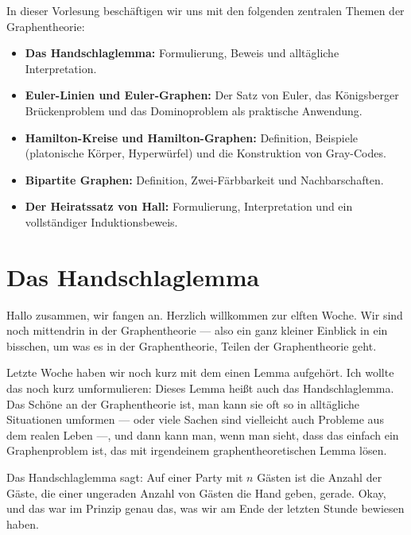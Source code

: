 

\begin{nice-box}
In dieser Vorlesung beschäftigen wir uns mit den folgenden zentralen Themen der Graphentheorie:
\begin{itemize}
    \item \textbf{Das Handschlaglemma:} Formulierung, Beweis und alltägliche Interpretation.
    \item \textbf{Euler-Linien und Euler-Graphen:} Der Satz von Euler, das Königsberger Brückenproblem und das Dominoproblem als praktische Anwendung.
    \item \textbf{Hamilton-Kreise und Hamilton-Graphen:} Definition, Beispiele (platonische Körper, Hyperwürfel) und die Konstruktion von Gray-Codes.
    \item \textbf{Bipartite Graphen:} Definition, Zwei-Färbbarkeit und Nachbarschaften.
    \item \textbf{Der Heiratssatz von Hall:} Formulierung, Interpretation und ein vollständiger Induktionsbeweis.
\end{itemize}
\end{nice-box}

\section{Das Handschlaglemma}

\begin{spoken-clean}[00:00:00 - 00:01:58]
Hallo zusammen, wir fangen an. Herzlich willkommen zur elften Woche. Wir sind noch mittendrin in der Graphentheorie --- also ein ganz kleiner Einblick in ein bisschen, um was es in der Graphentheorie, Teilen der Graphentheorie geht.

Letzte Woche haben wir noch kurz mit dem einen Lemma aufgehört. Ich wollte das noch kurz umformulieren: Dieses Lemma heißt auch das Handschlaglemma.  Das Schöne an der Graphentheorie ist, man kann sie oft so in alltägliche Situationen umformen --- oder viele Sachen sind vielleicht auch Probleme aus dem realen Leben ---, und dann kann man, wenn man sieht, dass das einfach ein Graphenproblem ist, das mit irgendeinem graphentheoretischen Lemma lösen.

Das Handschlaglemma sagt: Auf einer Party mit $n$ Gästen ist die Anzahl der Gäste, die einer ungeraden Anzahl von Gästen die Hand geben, gerade. Okay, und das war im Prinzip genau das, was wir am Ende der letzten Stunde bewiesen haben.
\end{spoken-clean}

